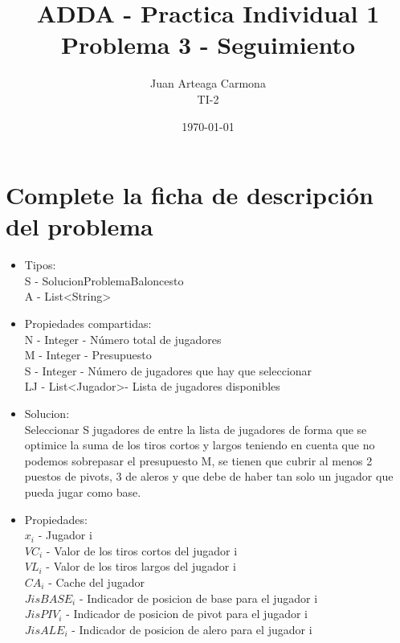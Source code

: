 \documentclass[a4paper,12pt]{article}
\title{ADDA - Practica Individual 1\\ Problema 3 - Seguimiento}
\author{Juan Arteaga Carmona\\TI-2}
\date{\today}
\begin{document}
\maketitle

\section{Complete la ficha de descripción del problema}


\begin{itemize}
 \item Tipos:\\
 S - SolucionProblemaBaloncesto\\
 A - List\textless String\textgreater

 \item Propiedades compartidas:\\
 N - Integer - Número total de jugadores\\
 M - Integer - Presupuesto\\
 S - Integer - Número de jugadores que hay que seleccionar\\
 LJ - List\textless Jugador\textgreater - Lista de jugadores disponibles\\
 \item Solucion:\\
Seleccionar S jugadores de entre la lista de jugadores de forma que se optimice
la suma de los tiros cortos y largos teniendo en cuenta que no podemos sobrepasar el presupuesto M, se tienen que cubrir
 al menos 2 puestos de pivots, 3 de aleros y que debe de haber tan solo un jugador
 que pueda jugar como base.


\item Propiedades:\\
\begin{math}
 x_i
\end{math}
- Jugador i\\
\begin{math}
VC_i
\end{math}
- Valor de los tiros cortos del jugador i\\
\begin{math}
VL_i
\end{math}
- Valor de los tiros largos del jugador i\\
 \begin{math}
CA_i
 \end{math}
 - Cache del jugador\\
 \begin{math}
JisBASE_i
 \end{math}
 - Indicador de posicion de base para el jugador i\\
 \begin{math}
JisPIV_i
 \end{math}
 - Indicador de posicion de pivot para el jugador i\\
 \begin{math}
JisALE_i
 \end{math}
 - Indicador de posicion de alero para el jugador i\\



\end{itemize}
\end{document}
